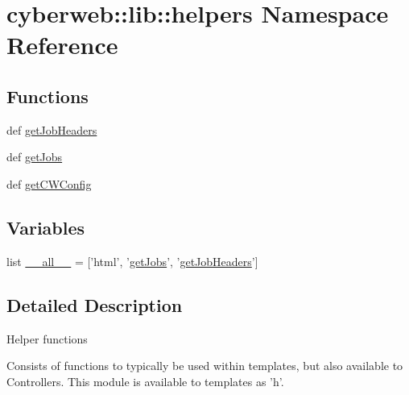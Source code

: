 \hypertarget{namespacecyberweb_1_1lib_1_1helpers}{\section{cyberweb\-:\-:lib\-:\-:helpers \-Namespace \-Reference}
\label{namespacecyberweb_1_1lib_1_1helpers}
}
\subsection*{\-Functions}
\begin{DoxyCompactItemize}
\item 
def \hyperlink{namespacecyberweb_1_1lib_1_1helpers_ac4e476c0a8e4e059a94167121dac2646}{get\-Job\-Headers}
\item 
def \hyperlink{namespacecyberweb_1_1lib_1_1helpers_a9877abe683b222021fb993ec10ee8075}{get\-Jobs}
\item 
def \hyperlink{namespacecyberweb_1_1lib_1_1helpers_ae511047427f281212e3ca331cce5a783}{get\-C\-W\-Config}
\end{DoxyCompactItemize}
\subsection*{\-Variables}
\begin{DoxyCompactItemize}
\item 
list \hyperlink{namespacecyberweb_1_1lib_1_1helpers_acbf58b845a485d1c983d79dd3d5e5a07}{\-\_\-\-\_\-all\-\_\-\-\_\-} = \mbox{[}'html', '\hyperlink{namespacecyberweb_1_1lib_1_1helpers_a9877abe683b222021fb993ec10ee8075}{get\-Jobs}', '\hyperlink{namespacecyberweb_1_1lib_1_1helpers_ac4e476c0a8e4e059a94167121dac2646}{get\-Job\-Headers}'\mbox{]}
\end{DoxyCompactItemize}


\subsection{\-Detailed \-Description}
\begin{DoxyVerb}Helper functions

Consists of functions to typically be used within templates, but also
available to Controllers. This module is available to templates as 'h'.
\end{DoxyVerb}
 

